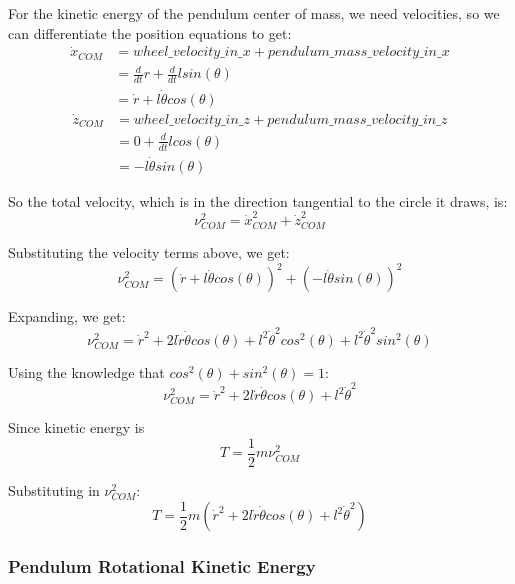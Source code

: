 For the kinetic energy of the pendulum center of mass, we need velocities, so we can differentiate the position equations to get:
\begin{align}
	\dot{x}_{COM} & = wheel\_velocity\_in\_x + pendulum\_mass\_velocity\_in\_x \\
              & = \frac{d}{dt} r + \frac{d}{dt} l sin(\theta) \\
              & = \dot{r} + l \dot{\theta} cos(\theta)
\end{align}
\begin{align}
	\dot{z}_{COM} & = wheel\_velocity\_in\_z + pendulum\_mass\_velocity\_in\_z \\
			  & = 0 + \frac{d}{dt} l cos(\theta) \\
			  & = - l \dot{\theta} sin(\theta)
\end{align}

So the total velocity, which is in the direction tangential to the circle it draws,  is:
\begin{equation}
	\nu^{2}_{COM} = \dot{x}^2_{COM} + \dot{z}^2_{COM}
\end{equation}

Substituting the velocity terms above, we get:
\begin{equation}
	\nu^{2}_{COM} = (\dot{r} + l \dot{\theta} cos(\theta))^2 + (- l \dot{\theta} sin(\theta))^2
\end{equation}

Expanding, we get:
\begin{equation}
	\nu^{2}_{COM} = \dot{r}^2 + 2 l \dot{r}\dot{\theta} cos(\theta) + l^2 \dot{\theta}^2 cos^2(\theta) + l^2 \dot{\theta}^2 sin^2(\theta)
\end{equation}

Using the knowledge that $cos^2(\theta) + sin^2(\theta) = 1$:
\begin{equation}
	\nu^{2}_{COM} = \dot{r}^2 + 2 l \dot{r}\dot{\theta} cos(\theta) + l^2 \dot{\theta}^2
\end{equation}

Since kinetic energy is
\begin{equation}
	T = \frac{1}{2}m\nu^2_{COM}
\end{equation}

Substituting in $\nu^{2}_{COM}$:
\begin{equation}
	T = \frac{1}{2}m(\dot{r}^2 + 2 l \dot{r}\dot{\theta} cos(\theta) + l^2 \dot{\theta}^2)
\end{equation}

\subsubsection{Pendulum Rotational Kinetic Energy}

